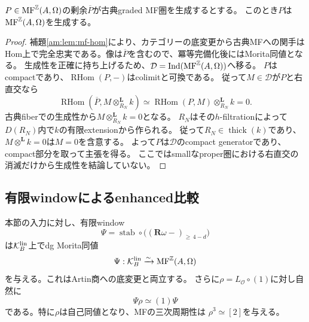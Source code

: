 \begin{lemma}[Artin基底上の生成子の持上げ]\label{am:lem:generator}
$P\in\operatorname{MF}^{\mathbb Z}(A,\Omega)$の剰余$\overline P$が古典graded MF圏を生成するとする。
このとき$P$は$\operatorname{MF}^{\mathbb Z}(A,\Omega)$を生成する。
\end{lemma}

\begin{proof}
補題\ref{am:lem:mf-hom}により、カテゴリーの底変更から古典MFへの関手は
Hom上で完全忠実である。像は$\overline P$を含むので、冪等完備化後にはMorita同値となる。
生成性を正確に持ち上げるため、$\mathcal D=\operatorname{Ind}(\operatorname{MF}^{\mathbb Z}(A,\Omega))$へ移る。
$P$はcompactであり、$\operatorname{RHom}(P,-)$はcolimitと可換である。
従って$M\in\mathcal D$が$P$と右直交なら
\[
 \operatorname{RHom}(\overline P,M\otimes_{R_N}^{\mathbf L}k)
 \simeq\operatorname{RHom}(P,M)\otimes_{R_N}^{\mathbf L}k=0.
\]
古典fiberでの生成性から$M\otimes_{R_N}^{\mathbf L}k=0$となる。
$R_N$はその$h$-filtrationによって$D(R_N)$内で$k$の有限extensionから作られる。
従って$R_N\in\operatorname{thick}(k)$であり、$M\otimes^{\mathbf L}k=0$は$M=0$を含意する。
よって$P$は$\mathcal D$のcompact generatorであり、compact部分を取って主張を得る。
ここではsmallなproper圏における右直交の消滅だけから生成性を結論していない。
\end{proof}

\subsection{有限windowによるenhanced比較}

\begin{theorem}[Artin線束残余pairのMF表示]\label{am:thm:comparison}
本節の入力に対し、有限window
\begin{equation}\label{am:eq:window-functor}
 \Psi=\operatorname{stab}\circ
       \bigl((\mathbf R\omega -)_{\ge\,4-d}\bigr)
\end{equation}
は$\mathcal K_B^{\rm lin}$上でdg Morita同値
\begin{equation}\label{am:eq:residual-mf}
 \Psi:\mathcal K_B^{\rm lin}\xrightarrow{\sim}\operatorname{MF}^{\mathbb Z}(A,\Omega)
\end{equation}
を与える。これはArtin商への底変更と両立する。
さらに$\rho=L_{\mathcal O}\circ(1)$に対し自然に
\begin{equation}\label{am:eq:rotation}
 \Psi\rho\simeq(1)\Psi
\end{equation}
である。特に$\rho$は自己同値となり、MFの三次周期性は
$\rho^3\simeq[2]$を与える。
\end{theorem}


